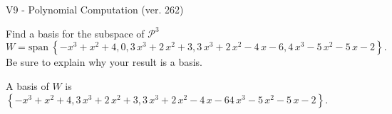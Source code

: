 \begin{exercise}
  \begin{exerciseTitle}V9 - Polynomial Computation (ver. 262)\end{exerciseTitle}
  \begin{exerciseStatement}
    Find a basis for the subspace of \(\mathcal{P}^3\) 
\[W=\mathrm{span}\ \left\{-x^{3} + x^{2} + 4 , 0 , 3 \, x^{3} + 2 \, x^{2} + 3 , 3 \, x^{3} + 2 \, x^{2} - 4 \, x - 6 , 4 \, x^{3} - 5 \, x^{2} - 5 \, x - 2\right\}.\]
 Be sure to explain why your result is a basis.


  \end{exerciseStatement}
  \begin{exerciseAnswer}
   A basis of \(W\) is  \(\left\{-x^{3} + x^{2} + 4 , 3 \, x^{3} + 2 \, x^{2} + 3 , 3 \, x^{3} + 2 \, x^{2} - 4 \, x - 6 4 \, x^{3} - 5 \, x^{2} - 5 \, x - 2\right\}\).
  


  \end{exerciseAnswer}
\end{exercise}